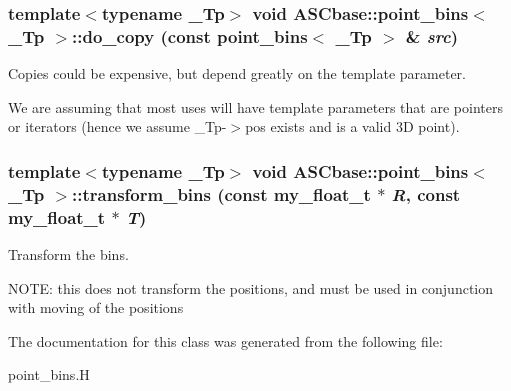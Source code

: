 \subsubsection{\setlength{\rightskip}{0pt plus 5cm}template$<$typename \_\-Tp$>$ void \bf{ASCbase::point\_\-bins}$<$ \_\-Tp $>$::do\_\-copy (const \bf{point\_\-bins}$<$ \_\-Tp $>$ \& {\em src})\hspace{0.3cm}{\tt  [inline, private]}}\label{classASCbase_1_1point__bins_94b59a7f0902763acb6004b2f208418e}


Copies could be expensive, but depend greatly on the template parameter. 

We are assuming that most uses will have template parameters that are pointers or iterators (hence we assume \_\-Tp-$>$pos exists and is a valid 3D point). 
\subsubsection{\setlength{\rightskip}{0pt plus 5cm}template$<$typename \_\-Tp$>$ void \bf{ASCbase::point\_\-bins}$<$ \_\-Tp $>$::transform\_\-bins (const my\_\-float\_\-t $\ast$ {\em R}, const my\_\-float\_\-t $\ast$ {\em T})\hspace{0.3cm}{\tt  [inline]}}\label{classASCbase_1_1point__bins_ae0c63c318c55d37a6abf7f8760f0bd9}


Transform the bins. 

NOTE: this does not transform the positions, and must be used in conjunction with moving of the positions 

The documentation for this class was generated from the following file:\begin{CompactItemize}
\item 
point\_\-bins.H\end{CompactItemize}
